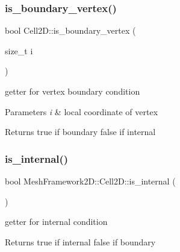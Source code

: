 \subsubsection{\texorpdfstring{is\+\_\+boundary\+\_\+vertex()}{is\_boundary\_vertex()}}
{\footnotesize\ttfamily bool Cell2\+D\+::is\+\_\+boundary\+\_\+vertex (\begin{DoxyParamCaption}\item[{size\+\_\+t}]{i }\end{DoxyParamCaption})}



getter for vertex boundary condition 


\begin{DoxyParams}{Parameters}
{\em i} & local coordinate of vertex\\
\hline
\end{DoxyParams}
\begin{DoxyReturn}{Returns}
true if boundary false if internal 
\end{DoxyReturn}
\mbox{\label{classMeshFramework2D_1_1Cell2D_a6c21f565043627c7032489dd0e5b22b1}} 
\subsubsection{\texorpdfstring{is\+\_\+internal()}{is\_internal()}}
{\footnotesize\ttfamily bool Mesh\+Framework2\+D\+::\+Cell2\+D\+::is\+\_\+internal (\begin{DoxyParamCaption}{ }\end{DoxyParamCaption})\hspace{0.3cm}{\ttfamily [inline]}}



getter for internal condition 

\begin{DoxyReturn}{Returns}
true if internal false if boundary 
\end{DoxyReturn}
\mbox{\label{classMeshFramework2D_1_1Cell2D_a34eab4c0d682a445d3536d6a8b0e7ed2}} 
